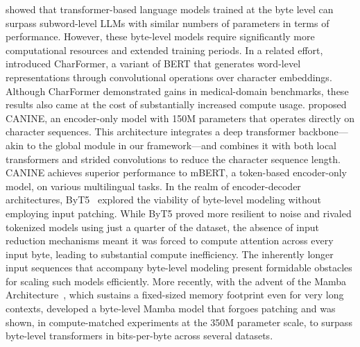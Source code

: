 \cite{Choe2019BridgingTG} showed that transformer-based language models trained at the byte level can surpass subword-level LLMs with similar numbers of parameters in terms of performance. However, these byte-level models require significantly more computational resources and extended training periods. In a related effort, \cite{el2020characterbert} introduced CharFormer, a variant of BERT that generates word-level representations through convolutional operations over character embeddings. Although CharFormer demonstrated gains in medical-domain benchmarks, these results also came at the cost of substantially increased compute usage. \cite{clark2022canine} proposed CANINE, an encoder-only model with 150M parameters that operates directly on character sequences. This architecture integrates a deep transformer backbone—akin to the global module in our framework—and combines it with both local transformers and strided convolutions to reduce the character sequence length. CANINE achieves superior performance to mBERT, a token-based encoder-only model, on various multilingual tasks. In the realm of encoder-decoder architectures, ByT5~\citep{xue2022byt5} explored the viability of byte-level modeling without employing input patching. While ByT5 proved more resilient to noise and rivaled tokenized models using just a quarter of the dataset, the absence of input reduction mechanisms meant it was forced to compute attention across every input byte, leading to substantial compute inefficiency. The inherently longer input sequences that accompany byte-level modeling present formidable obstacles for scaling such models efficiently. More recently, with the advent of the Mamba Architecture~\citep{gu2023mamba}, which sustains a fixed-sized memory footprint even for very long contexts, \cite{wang2024mambabyte} developed a byte-level Mamba model that forgoes patching and was shown, in compute-matched experiments at the 350M parameter scale, to surpass byte-level transformers in bits-per-byte across several datasets.

